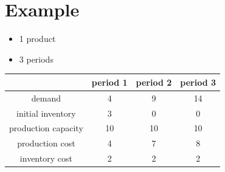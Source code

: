 \documentclass[10pt]{article}
\begin{document}
\section{Example}
\begin{itemize}
    \item 1 product
    \item 3 periods 
\end{itemize}
\begin{center}
    \begin{tabular}{|c|c|c|c|}
        \hline 
        & period 1 & period 2 & period 3\\\hline 
        demand & 4 & 9 & 14\\\hline 
        initial inventory & 3 & 0 & 0 \\\hline 
        production capacity & 10 & 10 & 10 \\\hline 
        production cost & 4 & 7 & 8\\\hline 
        inventory cost & 2 & 2 & 2\\\hline 
    \end{tabular}
\end{center}
\end{document}
